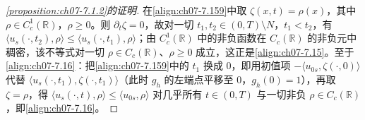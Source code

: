 \documentclass[../../main.tex]{subfiles}%
\begin{document}
\begin{proof}[\cref{proposition:ch07-7.1.2}的证明]
在\eqref{align:ch07-7.159}中取 $\zeta(x,t)=\rho(x)$，其中 $\rho\in C_c^1(\mathbb{R})$，$\rho\geqslant0$。则 $\partial_t\zeta=0$，故对一切 $t_1,t_2\in(0,T)\setminus N$，$t_1<t_2$，有 $\langle u_s(\cdot,t_2),\rho\rangle\leqslant\langle u_s(\cdot,t_1),\rho\rangle$；由 $C_c^1(\mathbb{R})$ 中的非负函数在 $C_c(\mathbb{R})$ 的非负元中稠密，该不等式对一切 $\rho\in C_c(\mathbb{R})$、$\rho\geqslant0$ 成立，这正是\eqref{align:ch07-7.15}。至于\eqref{align:ch07-7.16}：把\eqref{align:ch07-7.159}中的 $t_1$ 换成 $0$，即用初值项 $-\langle u_{0s},\zeta(\cdot,0)\rangle$ 代替 $\langle u_s(\cdot,t_1),\zeta(\cdot,t_1)\rangle$（此时 $g_h$ 的左端点平移至 $0$，$g_h(0)=1$），再取 $\zeta=\rho$，得 $\langle u_s(\cdot,t),\rho\rangle\leqslant\langle u_{0s},\rho\rangle$ 对几乎所有 $t\in(0,T)$ 与一切非负 $\rho\in C_c(\mathbb{R})$，即\eqref{align:ch07-7.16}。


\end{proof}
\end{document}
